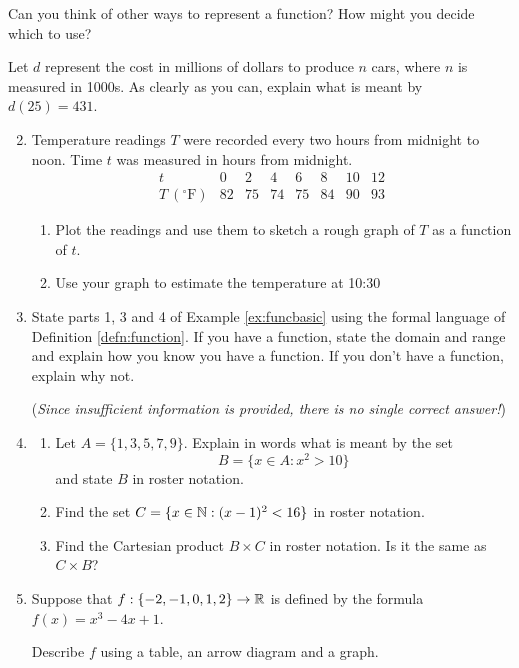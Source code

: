 Can you think of other ways to represent a function? How might you decide which to use?


\goodbreak


\begin{exercises}{}{}
	\exstart Let $d$ represent the cost in millions of dollars to produce $n$ cars, where $n$ is measured in 1000s. As clearly as you can, explain what is meant by $d(25)=431$. 

	\begin{enumerate}\setcounter{enumi}{1}
		\item\label{exs:templinear} Temperature readings $T$ were recorded every two hours from midnight to noon. Time $t$ was measured in hours from midnight.
	  \[
	  	\begin{array}{l|ccccccc}
	  		t&0&2&4&6&8&10&12\\\hline
	  		T\ (^\circ\mathrm{F})&82&75&74&75&84&90&93
	  	\end{array}
	  \]
	  \begin{enumerate}
	    \item Plot the readings and use them to sketch a rough graph of $T$ as a function of $t$.
	    \item Use your graph to estimate the temperature at 10:30\AM
	  \end{enumerate}
	  
	  
	  \item State parts 1, 3 and 4 of Example \ref{ex:funcbasic} using the formal language of Definition \ref{defn:function}. If you have a function, state the domain and range and explain how you know you have a function. If you don't have a function, explain why not.
	  \par
	  (\emph{Since insufficient information is provided, there is no single correct answer!})
	  
	  
	  \item\begin{enumerate}
	    \item Let $A=\{1,3,5,7,9\}$. Explain in words what is meant by the set
	    \[
	    	B=\{x\in A:x^2>10\}
	    \]
	    and state $B$ in roster notation.
	    \item Find the set $C=\{x\in\mathbb{N}:(x-1)^2<16\}$ in roster notation.
	    \item Find the Cartesian product $B\times C$ in roster notation. Is it the same as $C\times B$?
	  \end{enumerate}
	  
	  
	  \item Suppose that $f:\{-2,-1,0,1,2\}\to\mathbb{R}$ is defined by the formula $f(x)=x^3-4x+1$.\par
	  Describe $f$ using a table, an arrow diagram and a graph.
	  

\end{enumerate}
\end{exercises}
